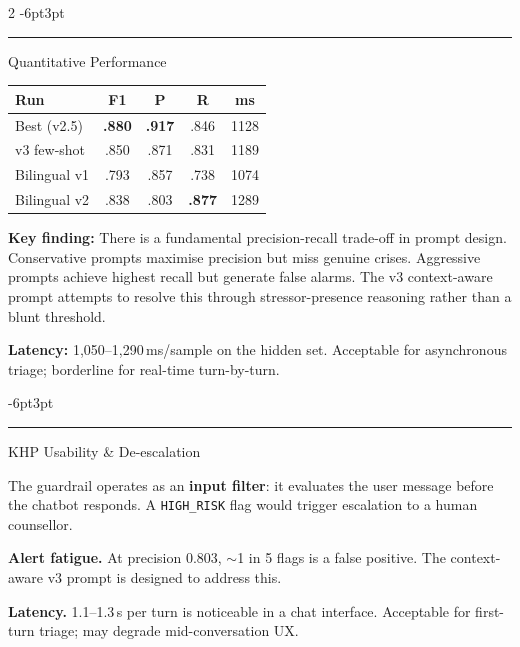 \documentclass[10pt]{article}
\makeatletter
\renewcommand{\section}{\@startsection{section}{1}{\z@}%
  {-6pt}{3pt}{\large\bfseries\color{khpblue}\hrule\vspace{2pt}}}
\makeatother
\begin{document}
\begin{multicols}{2}
\section{Quantitative Performance}

\begin{center}
\label{tab:results}
\small
\begin{tabular}{lcccc}
\toprule
\textbf{Run} & \textbf{F1} & \textbf{P} & \textbf{R} & \textbf{ms}\\
\midrule
Best (v2.5) & \textbf{.880} & \textbf{.917} & .846 & 1128\\
v3 few-shot & .850 & .871 & .831 & 1189\\
Bilingual v1 & .793 & .857 & .738 & 1074\\
Bilingual v2 & .838 & .803 & \textbf{.877} & 1289\\
\bottomrule
\end{tabular}
\end{center}

\textbf{Key finding:} There is a fundamental precision-recall trade-off in prompt design.
Conservative prompts maximise precision but miss genuine crises.
Aggressive prompts achieve highest recall but generate false alarms.
The v3 context-aware prompt attempts to resolve this through
stressor-presence reasoning rather than a blunt threshold.

\textbf{Latency:} 1,050--1,290\,ms/sample on the hidden set.
Acceptable for asynchronous triage; borderline for real-time turn-by-turn.

\section{KHP Usability \& De-escalation}

The guardrail operates as an \textbf{input filter}:
it evaluates the user message before the chatbot responds.
A \texttt{HIGH\_RISK} flag would trigger escalation to a human counsellor.

\textbf{Alert fatigue.} At precision 0.803, $\sim$1 in 5 flags is a false positive.
The context-aware v3 prompt is designed to address this.

\textbf{Latency.} 1.1--1.3\,s per turn is noticeable in a chat interface.
Acceptable for first-turn triage; may degrade mid-conversation UX.


\end{multicols}
\end{document}
